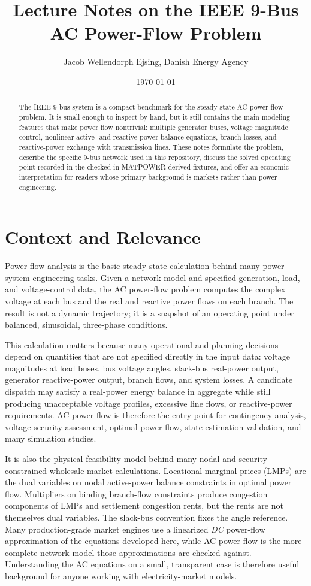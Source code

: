 \documentclass[11pt]{article}
\title{Lecture Notes on the IEEE 9-Bus AC Power-Flow Problem}
\author{Jacob Wellendorph Ejsing, Danish Energy Agency}
\date{\today}
\begin{document}
\maketitle

\begin{abstract}
The IEEE 9-bus system is a compact benchmark for the steady-state AC
power-flow problem. It is small enough to inspect by hand, but it still
contains the main modeling features that make power flow nontrivial:
multiple generator buses, voltage magnitude control, nonlinear active-
and reactive-power balance equations, branch losses, and reactive-power
exchange with transmission lines. These notes formulate the problem,
describe the specific 9-bus network used in this repository, discuss
the solved operating point recorded in the checked-in MATPOWER-derived
fixtures, and offer an economic interpretation for readers whose primary
background is markets rather than power engineering.
\end{abstract}

\section{Context and Relevance}

Power-flow analysis is the basic steady-state calculation behind many
power-system engineering tasks. Given a network model and specified
generation, load, and voltage-control data, the AC power-flow problem
computes the complex voltage at each bus and the real and reactive power
flows on each branch. The result is not a dynamic trajectory; it is a
snapshot of an operating point under balanced, sinusoidal, three-phase
conditions.

This calculation matters because many operational and planning decisions
depend on quantities that are not specified directly in the input data:
voltage magnitudes at load buses, bus voltage angles, slack-bus real-power
output, generator reactive-power output, branch flows, and system losses.
A candidate dispatch may satisfy a real-power energy balance in aggregate
while still producing unacceptable voltage profiles, excessive line flows,
or reactive-power requirements. AC power flow is therefore the entry point
for contingency analysis, voltage-security assessment, optimal power flow,
state estimation validation, and many simulation studies.

It is also the physical feasibility model behind many nodal and
security-constrained wholesale market calculations. Locational marginal
prices (LMPs) are the dual variables on nodal active-power balance
constraints in optimal power flow. Multipliers on binding branch-flow
constraints produce congestion components of LMPs and settlement
congestion rents, but the rents are not themselves dual variables. The
slack-bus convention fixes the angle reference. Many production-grade
market engines use a linearized \emph{DC} power-flow approximation of
the equations developed here, while AC power flow is the more complete
network model those approximations are checked against. Understanding
the AC equations on a small, transparent case is therefore useful
background for anyone working with electricity-market models.
\end{document}
